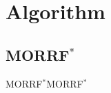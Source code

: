 \section{Algorithm}

\subsection{MORRF$^{*}$}

\begin{frame}{MORRF$^{*}$}{MORRF$^{*}$}
	
\end{frame}